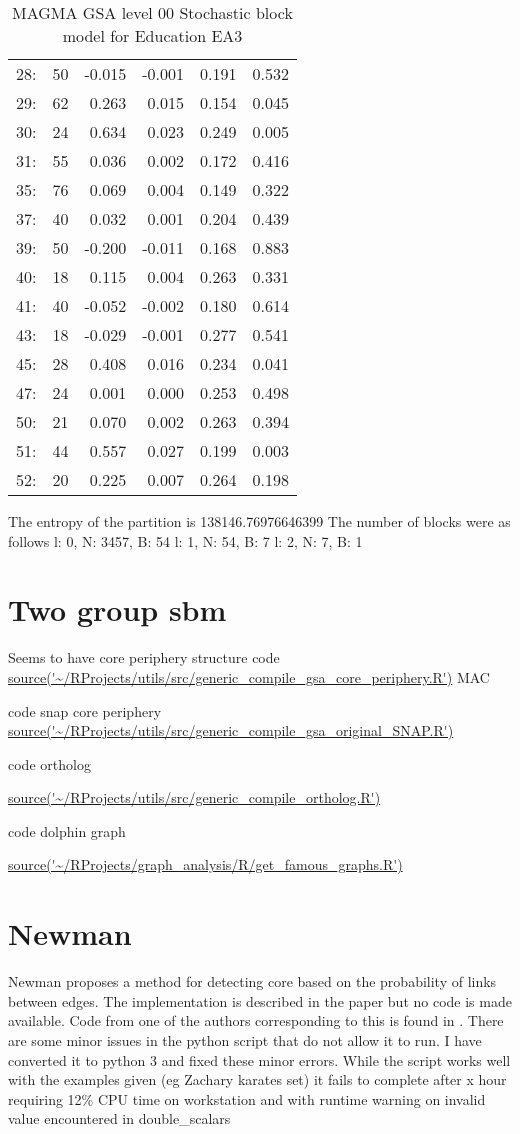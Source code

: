 \begin{table}[ht]
\begin{tabular}{lrrrrr}
  28: &   50 & -0.015 & -0.001 & 0.191 & 0.532 \\ 
  29: &   62 & 0.263 & 0.015 & 0.154 & 0.045 \\ 
  30: &   24 & 0.634 & 0.023 & 0.249 & 0.005 \\ 
  31: &   55 & 0.036 & 0.002 & 0.172 & 0.416 \\ 
  35: &   76 & 0.069 & 0.004 & 0.149 & 0.322 \\ 
  37: &   40 & 0.032 & 0.001 & 0.204 & 0.439 \\ 
  39: &   50 & -0.200 & -0.011 & 0.168 & 0.883 \\ 
  40: &   18 & 0.115 & 0.004 & 0.263 & 0.331 \\ 
  41: &   40 & -0.052 & -0.002 & 0.180 & 0.614 \\ 
  43: &   18 & -0.029 & -0.001 & 0.277 & 0.541 \\ 
  45: &   28 & 0.408 & 0.016 & 0.234 & 0.041 \\ 
  47: &   24 & 0.001 & 0.000 & 0.253 & 0.498 \\ 
  50: &   21 & 0.070 & 0.002 & 0.263 & 0.394 \\ 
  51: &   44 & 0.557 & 0.027 & 0.199 & 0.003 \\ 
  52: &   20 & 0.225 & 0.007 & 0.264 & 0.198 \\ 
   \hline
\end{tabular}
\caption{MAGMA GSA level 00 Stochastic block model for Education EA3} 
\end{table}
The entropy of the partition is 138146.76976646399
The number of blocks were as follows
l: 0, N: 3457, B: 54
l: 1, N: 54, B: 7
l: 2, N: 7, B: 1

\section{Two group sbm}
Seems to have core periphery structure 
code \url{source('~/RProjects/utils/src/generic_compile_gsa_core_periphery.R')} MAC

code snap core periphery \url{source('~/RProjects/utils/src/generic_compile_gsa_original_SNAP.R')}

code ortholog

\url{source('~/RProjects/utils/src/generic_compile_ortholog.R')}

code dolphin graph

\url{ source('~/RProjects/graph_analysis/R/get_famous_graphs.R')}

\section{Newman}
Newman proposes a method for detecting core based on the probability of links between edges. The implementation is described in the paper but no code is made available. Code from one of the authors corresponding to this is found in . There are some minor issues in the python script that do not allow it to run. I have converted it to python 3 and fixed these minor errors. While the script works well with the examples given (eg Zachary karates set) it fails to complete after x hour requiring 12\% CPU time on workstation and with runtime warning on invalid value encountered in double\_scalars

